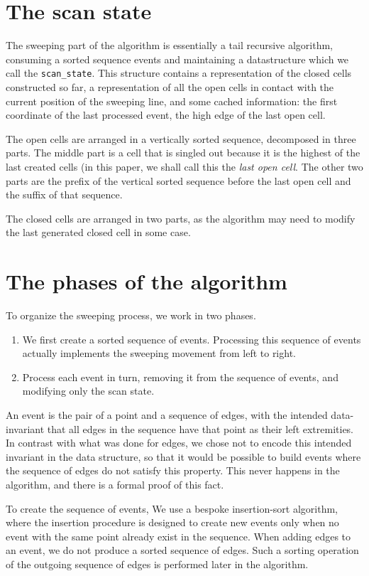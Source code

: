 \documentclass[a4paper, USenglish, cleveref, autoref, thm-restate]{lipics-v2021}
\begin{document}
\section{The scan state}

The sweeping part of the algorithm is essentially a tail recursive
algorithm, consuming a sorted sequence events and
maintaining a datastructure which we call the {\tt scan\_state}.  This
structure contains a representation of the closed cells constructed so
far, a representation of all the open cells in contact with the
current position of the sweeping line, and some cached information:
the first coordinate of the last processed event, the high edge of the
last open cell.

The open cells are arranged in a vertically sorted sequence,
decomposed in three parts.  The middle part is a cell that is singled
out because it is the highest of the last created cells (in this
paper, we shall call this the {\em last open cell}.  The other two
parts are the prefix of the vertical sorted sequence before the last
open cell and the suffix of that sequence.

The closed cells are arranged in two parts, as the algorithm may need
to modify the last generated closed cell in some case.

\section{The phases of the algorithm}
To organize the sweeping process, we work in two phases.
\begin{enumerate}
\item  We first
create a sorted sequence of events.  Processing this sequence of
events actually implements the sweeping movement from left to right.
\item Process each event in turn, removing it from the sequence of
  events, and modifying only the scan state.
\end{enumerate}

An event is the pair of a point and a sequence of edges, with the
intended data-invariant
that all edges in the sequence have that point as their left
extremities.  In contrast with what was done for edges, we chose not
to encode this intended invariant in the data structure, so that it
would be possible to build events where the sequence of edges do not
satisfy this property.  This never happens in the algorithm, and there
is a formal proof of this fact.

To create the sequence of events,
We use a bespoke insertion-sort algorithm, where the insertion
procedure is designed to create new events only when no event with the
same point already exist in the sequence.  When adding edges to an
event, we do not produce a sorted sequence of edges.  Such a sorting
operation of the outgoing sequence of edges is performed later in the
algorithm.
\end{document}
